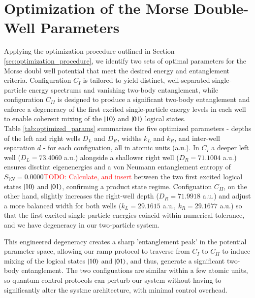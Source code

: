 \documentclass{subfiles}
\begin{document}
\section{Optimization of the Morse Double-Well Parameters}\label{sec:optimization_result}
Applying the optimization procedure outlined in Section \ref{sec:optimization_procedure}, we identify two sets of optimal parameters for the Morse doubl well potential that meet the desired energy and entanglement criteria. Configuration $C_I$ is tailored to yield distinct, well-separated single-particle energy spectrums and vanishing two-body entanglement, while configuration $C_{II}$ is designed to produce a significant two-body entanglement and enforce a degeneracy of the first excited single-particle energy levels in each well to enable coherent mixing of the $\ket{10}$ and $\ket{01}$ logical states.
\\ 

Table \ref{tab:optimized_params} summarizes the five optimized parameters - depths of the left and right wells $D_L$ and $D_R$, widths $k_L$ and $k_R$, and inter-well separation $d$ -  for each configuation, all in atomic units (a.u.). In $C_I$ a deeper left well ($D_L = 73.4060$ a.u.) alongside a shallower right well ($D_R = 71.1004$ a.u.) ensures disctint eigenenergies and a von Neumann entanglement entropy of $S_{VN} = 0.0000$\textcolor{red}{TODO: Calculate, and insert} between the two first excited logical states $\ket{10}$ and $\ket{01}$, confirming a product state regime. Configuation $C_{II}$, on the other hand, slightly increases the right-well depth ($D_R = 71.9918$ a.u.) and adjust a more balanced width for both wells ($k_L = 29.1615$ a.u., $k_R = 29.1677$ a.u.) so that the first excited single-particle energies coincid within numerical tolerance, and we have degeneracy in our two-particle system.

This engineered degeneracy creates a sharp 'entanglement peak' in the potential parameter space, allowing our ramp protocol to traverse from $C_I$ to $C_{II}$ to induce mixing of the logical states $\ket{10}$ and $\ket{01}$, and thus, generate a significant two-body entanglement. The two configuations are similar within a few atomic units, so quantum control protocols can perturb our system without having to significantly alter the systme architecture, with minimal control overhead. \\
\end{document}
